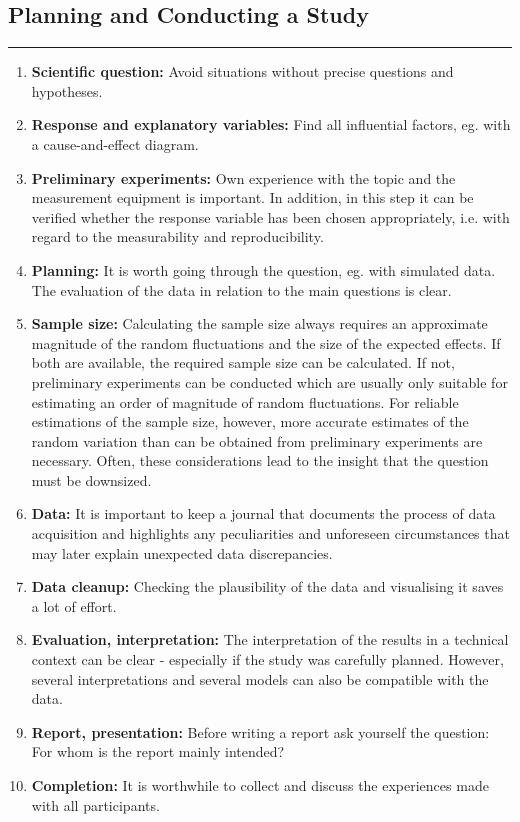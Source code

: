 \subsection{Planning and Conducting a Study}
\noindent\rule[\linienAbstand]{\linewidth}{\linienDicke}
\begin{enumerate}
  \item \textbf{Scientific question:} Avoid situations without precise questions and hypotheses.
  \item \textbf{Response and explanatory variables:} Find all influential factors, eg. with a cause-and-effect diagram.
  \item \textbf{Preliminary experiments:} Own experience with the topic and the measurement equipment is important. In addition, in this step it can be verified whether the response variable has been chosen appropriately, i.e. with regard to the measurability and reproducibility.
  \item \textbf{Planning:} It is worth going through the question, eg. with simulated data. The evaluation of the data in relation to the main questions is clear.
  \item \textbf{Sample size:} Calculating the sample size always requires an approximate magnitude of the random fluctuations and the size of the expected effects. If both are available, the required sample size can be calculated. If not, preliminary experiments can be conducted which are usually only suitable for estimating an order of magnitude of random fluctuations.
  For reliable estimations of the sample size, however, more accurate estimates of the random variation than can be obtained from preliminary experiments
  are necessary. Often, these considerations lead to the insight that the question must be downsized.
  \item \textbf{Data:} It is important to keep a journal that documents the process of data acquisition and highlights any peculiarities and unforeseen circumstances that may later explain unexpected data discrepancies.
  \item \textbf{Data cleanup:} Checking the plausibility of the data and visualising it saves a lot of effort.
  \item \textbf{Evaluation, interpretation:} The interpretation of the results in a technical context can be clear - especially if the study was carefully planned. However, several interpretations and several models can also be compatible with the data.
  \item \textbf{Report, presentation:} Before writing a report ask yourself the question: For whom is the report mainly intended?
  \item \textbf{Completion:} It is worthwhile to collect and discuss the experiences made with all participants.
\end{enumerate}
\vfill\null
\columnbreak
